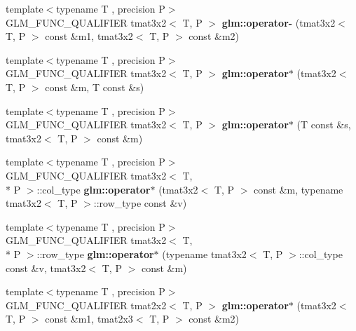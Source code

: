 \begin{DoxyCompactItemize}
\item 
\hypertarget{namespaceglm_a217d480e9710e6861a9b0bfeb767758c}{{\footnotesize template$<$typename T , precision P$>$ }\\G\-L\-M\-\_\-\-F\-U\-N\-C\-\_\-\-Q\-U\-A\-L\-I\-F\-I\-E\-R tmat3x2$<$ T, P $>$ {\bfseries glm\-::operator-\/} (tmat3x2$<$ T, P $>$ const \&m1, tmat3x2$<$ T, P $>$ const \&m2)}\label{namespaceglm_a217d480e9710e6861a9b0bfeb767758c}

\item 
\hypertarget{namespaceglm_a9b2577e315bb7b464cc0e6ca13337bcb}{{\footnotesize template$<$typename T , precision P$>$ }\\G\-L\-M\-\_\-\-F\-U\-N\-C\-\_\-\-Q\-U\-A\-L\-I\-F\-I\-E\-R tmat3x2$<$ T, P $>$ {\bfseries glm\-::operator$\ast$} (tmat3x2$<$ T, P $>$ const \&m, T const \&s)}\label{namespaceglm_a9b2577e315bb7b464cc0e6ca13337bcb}

\item 
\hypertarget{namespaceglm_a772054b40ec7f37656fefb0b30cf3bea}{{\footnotesize template$<$typename T , precision P$>$ }\\G\-L\-M\-\_\-\-F\-U\-N\-C\-\_\-\-Q\-U\-A\-L\-I\-F\-I\-E\-R tmat3x2$<$ T, P $>$ {\bfseries glm\-::operator$\ast$} (T const \&s, tmat3x2$<$ T, P $>$ const \&m)}\label{namespaceglm_a772054b40ec7f37656fefb0b30cf3bea}

\item 
\hypertarget{namespaceglm_a130119d8e3a84e658a490564c3994e82}{{\footnotesize template$<$typename T , precision P$>$ }\\G\-L\-M\-\_\-\-F\-U\-N\-C\-\_\-\-Q\-U\-A\-L\-I\-F\-I\-E\-R tmat3x2$<$ T, \\*
P $>$\-::col\-\_\-type {\bfseries glm\-::operator$\ast$} (tmat3x2$<$ T, P $>$ const \&m, typename tmat3x2$<$ T, P $>$\-::row\-\_\-type const \&v)}\label{namespaceglm_a130119d8e3a84e658a490564c3994e82}

\item 
\hypertarget{namespaceglm_afb6b62d8d61e83273b7694a60341ba97}{{\footnotesize template$<$typename T , precision P$>$ }\\G\-L\-M\-\_\-\-F\-U\-N\-C\-\_\-\-Q\-U\-A\-L\-I\-F\-I\-E\-R tmat3x2$<$ T, \\*
P $>$\-::row\-\_\-type {\bfseries glm\-::operator$\ast$} (typename tmat3x2$<$ T, P $>$\-::col\-\_\-type const \&v, tmat3x2$<$ T, P $>$ const \&m)}\label{namespaceglm_afb6b62d8d61e83273b7694a60341ba97}

\item 
\hypertarget{namespaceglm_a41c5d9d01bb642d45a1e71fc27328470}{{\footnotesize template$<$typename T , precision P$>$ }\\G\-L\-M\-\_\-\-F\-U\-N\-C\-\_\-\-Q\-U\-A\-L\-I\-F\-I\-E\-R tmat2x2$<$ T, P $>$ {\bfseries glm\-::operator$\ast$} (tmat3x2$<$ T, P $>$ const \&m1, tmat2x3$<$ T, P $>$ const \&m2)}\label{namespaceglm_a41c5d9d01bb642d45a1e71fc27328470}


\end{DoxyCompactItemize}
